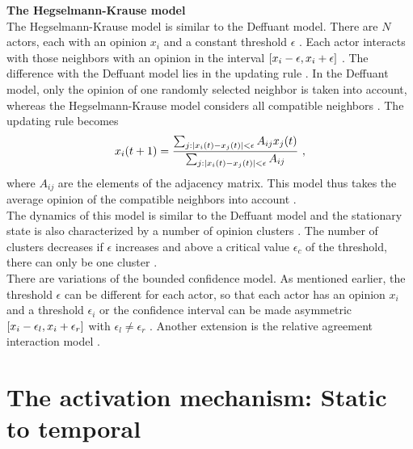 \documentclass[11 pt , letterpaper , twoside , openright]{book}
\begin{document}
\newline
\textbf{The Hegselmann-Krause model}\\
\newline
The Hegselmann-Krause model is similar to the Deffuant model. There are $N$ actors, each with an opinion $x_i$ and a constant threshold $\epsilon$ \cite{Castellano2009}. Each actor interacts with those neighbors with an opinion in the interval $\interval{x_i-\epsilon}{x_i+\epsilon}$ \cite{Castellano2009}. The difference with the Deffuant model lies in the updating rule \cite{Castellano2009}. In the Deffuant model, only the opinion of one randomly selected neighbor is taken into account, whereas the Hegselmann-Krause model considers all compatible neighbors \cite{Castellano2009}. The updating rule becomes \cite{Castellano2009}
\begin{equation}
	x_i(t+1) = \frac{\sum_{j:\abs{x_i(t) - x_j(t)}<\epsilon}A_{ij}x_j(t)}{\sum_{j:\abs{x_i(t) - x_j(t)}<\epsilon}A_{ij}} \ ,
\end{equation}
where $A_{ij}$ are the elements of the adjacency matrix. This model thus takes the average opinion of the compatible neighbors into account \cite{Castellano2009}.\\
\newline
The dynamics of this model is similar to the Deffuant model and the stationary state is also characterized by a number of opinion clusters \cite{Castellano2009}. The number of clusters decreases if $\epsilon$ increases and above a critical value $\epsilon_c$ of the threshold, there can only be one cluster \cite{Castellano2009}.\\
\newline
There are variations of the bounded confidence model. As mentioned earlier, the threshold $\epsilon$ can be different for each actor, so that each actor has an opinion $x_i$ and a threshold $\epsilon_i$ or the confidence interval can be made asymmetric $\interval{x_i - \epsilon_l}{x_i + \epsilon_r}$ with $\epsilon_l \neq
\epsilon_r$ \cite{Krause2002}. Another extension is the relative agreement interaction model \cite{Deffuant2006}\cite{Deffuant2002}.

\section{The activation mechanism: Static to temporal}\label{actMech}
\end{document}
